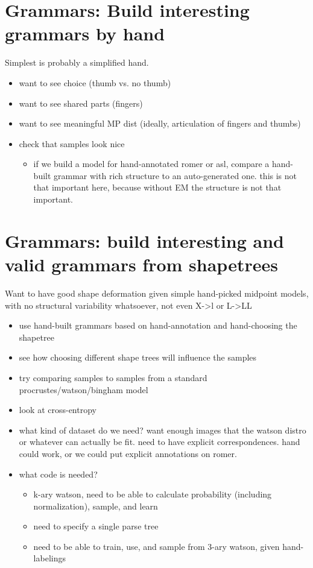 \documentclass{book}
\begin{document}
\section{Grammars: Build interesting grammars by hand}
\label{sec-5_11}

Simplest is probably a simplified hand.
\begin{itemize}
\item want to see choice (thumb vs. no thumb)
\item want to see shared parts (fingers)
\item want to see meaningful MP dist (ideally, articulation of
   fingers and thumbs)
\item check that samples look nice

\begin{itemize}
\item if we build a model for hand-annotated romer or asl, compare a
    hand-built grammar with rich structure to an auto-generated
    one. this is not that important here, because without EM the
    structure is not that important.
\end{itemize}

\end{itemize}
\section{Grammars: build interesting and valid grammars from shapetrees}
\label{sec-5_12}

Want to have good shape deformation given simple hand-picked midpoint
models, with no structural variability whatsoever, not even X->l or
L->LL
\begin{itemize}
\item use hand-built grammars based on hand-annotation and
    hand-choosing the shapetree
\item see how choosing different shape trees will influence the
    samples
\item try comparing samples to samples from a standard
    procrustes/watson/bingham model
\item look at cross-entropy
\item what kind of dataset do we need? want enough images that the
    watson distro or whatever can actually be fit. need to have
    explicit correspondences. hand could work, or we could put
    explicit annotations on romer.
\item what code is needed?

\begin{itemize}
\item k-ary watson, need to be able to calculate probability
      (including normalization), sample, and learn
\item need to specify a single parse tree
\item need to be able to train, use, and sample from 3-ary watson,
      given hand-labelings
\end{itemize}

\end{itemize}
\end{document}
